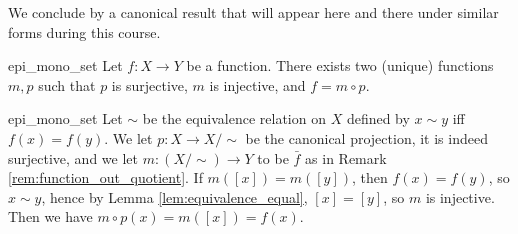 We conclude by a canonical result that will appear here and there under similar forms during this course.
\begin{cthm}{}{epi_mono_set}
    Let \( f : X \to Y \) be a function. There exists two (unique) functions \( m, p \) such that \( p \) is surjective, \( m \) is injective, and \( f = m \circ p \). 
\end{cthm}
\begin{thmproof}{epi_mono_set}
    Let \( \sim \) be the equivalence relation on \( X \) defined by \( x \sim y \) iff \( f(x) = f(y) \). We let \( p : X \to X/\sim \) be the canonical projection, it is indeed surjective, and we let \( m : (X/\sim) \to Y \) to be \( \bar f \) as in Remark \ref{rem:function_out_quotient}. If \( m([x]) = m([y]) \), then \( f(x) = f(y) \), so \( x \sim y \), hence by Lemma \ref{lem:equivalence_equal}, \( [x] = [y] \), so \( m \) is injective. Then we have \( m\circ p(x) = m([x]) = f(x) \).
\end{thmproof}